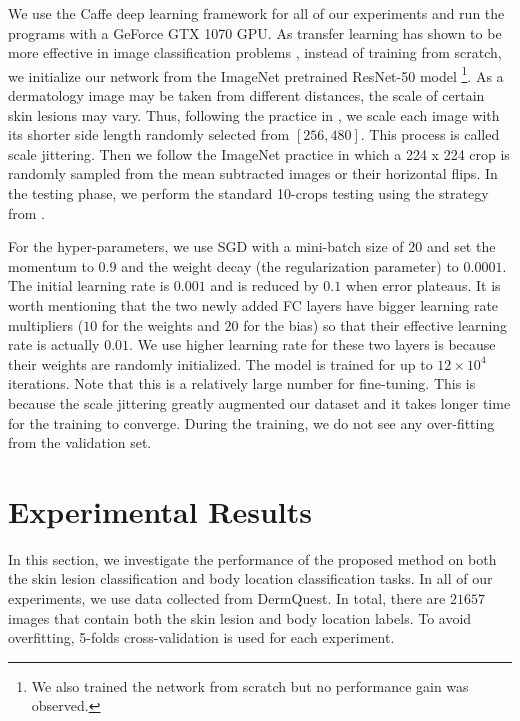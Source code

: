 \documentclass[letterpaper]{article}
\begin{document}
We use the Caffe deep learning framework \cite{DBLP:conf/mm/JiaSDKLGGD14} for
all of our experiments and run the programs with a GeForce GTX 1070 GPU. As transfer
learning has shown to be more effective in image classification problems
\cite{DBLP:conf/cvpr/RazavianASC14}, instead of training from scratch, we
initialize our network from the ImageNet \cite{DBLP:conf/cvpr/DengDSLL009} pretrained
ResNet-50 model \footnote{We also trained the network from scratch but no
performance gain was observed.}. As a dermatology image may be taken from different
distances, the scale of certain skin lesions may vary. Thus, following the practice in \cite{DBLP:journals/corr/SimonyanZ14a}, we scale each image with its shorter side length randomly selected
from $[256, 480]$. This process is called scale jittering. Then we follow the ImageNet
practice in which a 224 x 224 crop is randomly sampled from the mean subtracted
images or their horizontal flips. In the testing phase, we perform the standard
10-crops testing using the strategy from \cite{DBLP:conf/nips/KrizhevskySH12}.

For the hyper-parameters, we use SGD with a mini-batch size of $20$ and set the
momentum to $0.9$ and the weight decay (the regularization parameter)
to $0.0001$. The initial learning rate is $0.001$ and is reduced by $0.1$ when
error plateaus. It is worth mentioning that the two newly added FC layers have
bigger learning rate multipliers ($10$ for the weights and $20$ for the bias) so
that their effective learning rate is actually $0.01$. We use higher learning rate
for these two layers is because their weights are randomly initialized. The model
is trained for up to $12 \times 10^4$ iterations. Note that this is a relatively
large number for fine-tuning. This is because the scale jittering greatly augmented our
dataset and it takes longer time for the training to converge. During the training,
we do not see any over-fitting from the validation set.

\section{Experimental Results}

In this section, we investigate the performance of the proposed method on both the
skin lesion classification and body location classification tasks. In all of our
experiments, we use data collected from DermQuest. In total, there are $21657$
images that contain both the skin lesion and body location labels. To avoid
overfitting, 5-folds cross-validation is used for each experiment.
\end{document}
